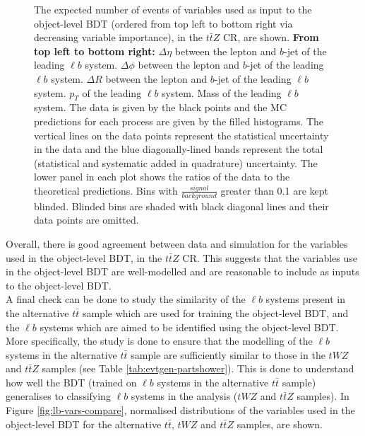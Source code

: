 \begin{figure}[htbp]
\caption{The expected number of events of variables used as input to the object-level BDT (ordered from top left to bottom right via decreasing variable importance), in the $t\bar{t}Z$ CR, are shown. \textbf{From top left to bottom right:} $\Delta \eta$ between the lepton and $b$-jet of the leading $\ell b$ system. $\Delta \phi$ between the lepton and $b$-jet of the leading $\ell b$ system. $\Delta R$ between the lepton and $b$-jet of the leading $\ell b$ system. $p_{T}$ of the leading $\ell b$ system. Mass of the leading $\ell b$ system. The data is given by the black points and the MC predictions for each process are given by the filled histograms. The vertical lines on the data points represent the statistical uncertainty in the data and the blue diagonally-lined bands represent the total (statistical and systematic added in quadrature) uncertainty. The lower panel in each plot shows the ratios of the data to the theoretical predictions. Bins with $\frac{signal}{background}$ greater than 0.1 are kept blinded. Blinded bins are shaded with black diagonal lines and their data points are omitted. }
  \label{fig:4lep-ttZCR-objectbdt-vars}
\end{figure}

Overall, there is good agreement between data and simulation for the variables used in the object-level BDT, in the $t\bar{t}Z$ CR. This suggests that the variables use in the object-level BDT are well-modelled and are reasonable to include as inputs to the object-level BDT. \\

A final check can be done to study the similarity of the $\ell b$ systems present in the alternative $t\bar{t}$ sample which are used for training the object-level BDT, and the $\ell b$ systems which are aimed to be identified using the object-level BDT. More specifically, the study is done to ensure that the modelling of the $\ell b$ systems in the alternative $t\bar{t}$ sample are sufficiently similar to those in the $tWZ$ and $t\bar{t}Z$ samples (see Table \ref{tab:evtgen-partshower}). This is done to understand how well the BDT (trained on $\ell b$ systems in the alternative $t\bar{t}$ sample) generalises to classifying $\ell b$ systems in the analysis ($tWZ$ and $t\bar{t}Z$ samples). In Figure \ref{fig:lb-vars-compare}, normalised distributions of the variables used in the object-level BDT for the alternative $t\bar{t}$, $tWZ$ and $t\bar{t}Z$ samples, are shown.



